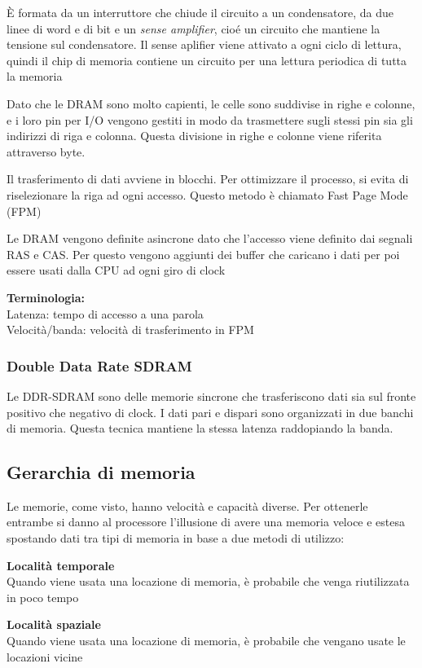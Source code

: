 \documentclass[12pt, a4paper]{article}
\begin{document}
È formata da un interruttore che chiude il circuito a un condensatore, da due linee di word e di bit e un \textit{
sense amplifier}, cioé un circuito che mantiene la tensione sul condensatore. Il sense aplifier viene attivato a 
ogni ciclo di lettura, quindi il chip di memoria contiene un circuito per una lettura periodica di tutta la memoria

Dato che le DRAM sono molto capienti, le celle sono suddivise in righe e colonne, e i loro pin per I/O vengono 
gestiti in modo da trasmettere sugli stessi pin sia gli indirizzi di riga e colonna. Questa divisione in righe e
colonne viene riferita attraverso byte.

Il trasferimento di dati avviene in blocchi. Per ottimizzare il processo, si evita di riselezionare la riga ad ogni
accesso. Questo metodo è chiamato Fast Page Mode (FPM)

Le DRAM vengono definite asincrone dato che l'accesso viene definito dai segnali RAS e CAS. Per questo vengono aggiunti
dei buffer che caricano i dati per poi essere usati dalla CPU ad ogni giro di clock

\textbf{Terminologia:}\\Latenza: tempo di accesso a una parola\\Velocità/banda: velocità di trasferimento in FPM

\subsubsection{Double Data Rate SDRAM}
Le DDR-SDRAM sono delle memorie sincrone che trasferiscono dati sia sul fronte positivo che negativo di clock. I
dati pari e dispari sono organizzati in due banchi di memoria. Questa tecnica mantiene la stessa latenza raddopiando 
la banda.

\subsection{Gerarchia di memoria}
Le memorie, come visto, hanno velocità e capacità diverse. Per ottenerle entrambe si danno al processore l'illusione 
di avere una memoria veloce e estesa spostando dati tra tipi di memoria in base a due metodi di utilizzo:

\textbf{Località temporale}\\
Quando viene usata una locazione di memoria, è probabile che venga riutilizzata in poco tempo

\textbf{Località spaziale}\\
Quando viene usata una locazione di memoria, è probabile che vengano usate le locazioni vicine
\end{document}
